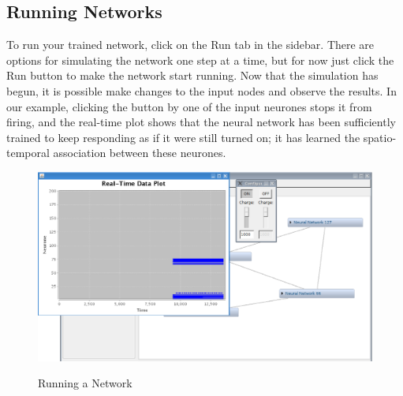 \documentclass[11pt]{report}
\begin{document}
\subsection{Running Networks}
{
To run your trained network, click on the Run tab in the sidebar. There are options for simulating the network one step at a time, but for now just click the Run button to make the network start running. Now that the simulation has begun, it is possible make changes to the input nodes and observe the results. In our example, clicking the button by one of the input neurones stops it from firing, and the real-time plot shows that the neural network has been sufficiently trained to keep responding as if it were still turned on; it has learned the spatio{}-temporal association between these neurones.

\begin{figure}[t]
\centering
\scalebox{0.35} {
	\includegraphics{run}
}
\caption{Running a Network}
\label{fig:run}
\end{figure}
}
\newpage
\end{document}
